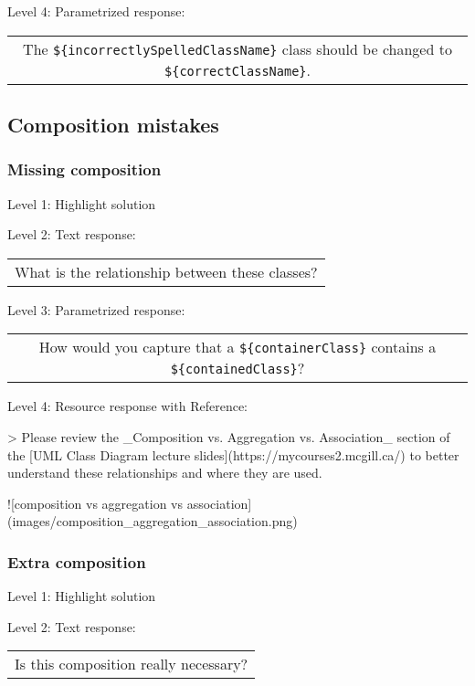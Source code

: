 \noindent Level 4: Parametrized response: \medskip

\begin{tabular}{|c}
The \verb|${incorrectlySpelledClassName}| class should be changed to \verb|${correctClassName}|.
\end{tabular} \medskip



\subsection{Composition mistakes}

\subsubsection{Missing composition}

\noindent Level 1: Highlight solution \medskip

\noindent Level 2: Text response: \medskip

\begin{tabular}{|c}
What is the relationship between these classes?
\end{tabular} \medskip

\noindent Level 3: Parametrized response: \medskip

\begin{tabular}{|c}
How would you capture that a \verb|${containerClass}| contains a \verb|${containedClass}|?
\end{tabular} \medskip

\noindent Level 4: Resource response with Reference:

> Please review the _Composition vs. Aggregation vs. Association_ section of 
the [UML Class Diagram lecture slides](https://mycourses2.mcgill.ca/) to 
better understand these relationships and where they are used.

![composition vs aggregation vs association](images/composition_aggregation_association.png)


\subsubsection{Extra composition}

\noindent Level 1: Highlight solution \medskip

\noindent Level 2: Text response: \medskip

\begin{tabular}{|c}
Is this composition really necessary?
\end{tabular} \medskip

